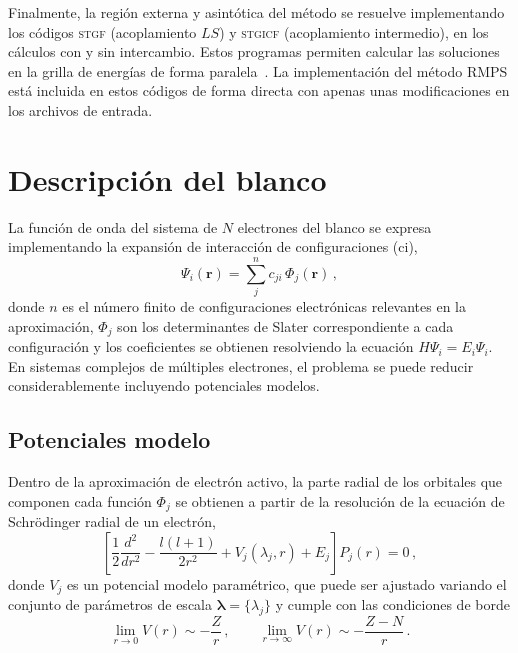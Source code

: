 Finalmente, la región externa y asintótica del método se resuelve 
implementando los códigos \textsc{stgf} (acoplamiento $LS$) y 
\textsc{stgicf} (acoplamiento intermedio), en los cálculos con y sin 
intercambio. Estos programas permiten calcular las soluciones en la 
grilla de energías de forma 
paralela~\cite{Mitnik:99,FernandezMenchero:20}. La implementación del 
método RMPS está incluida en estos códigos de forma directa con apenas 
unas modificaciones en los archivos de entrada.

\section{Descripción del blanco}
\label{sec:target-rmatrix}

La función de onda del sistema de $N$ electrones del blanco se expresa 
implementando la expansión de interacción de configuraciones (\acs{ci}),
\begin{equation*}
\Psi_i(\mathbf{r}) =
\sum_j^{n} c_{ji} \, \Phi_j(\mathbf{r})\,,
\end{equation*}
donde $n$ es el número finito de configuraciones electrónicas relevantes 
en la aproximación, $\Phi_j$ son los determinantes de Slater 
correspondiente a cada configuración y los coeficientes se obtienen 
resolviendo la ecuación $H\Psi_i=E_i\Psi_i$. En sistemas complejos de 
múltiples electrones, el problema se puede reducir considerablemente 
incluyendo potenciales modelos. 

\subsection{Potenciales modelo}
\label{subsec:potmod-rmatrix}

Dentro de la aproximación de electrón activo, la parte radial 
de los orbitales que componen cada función $\Phi_j$ se obtienen a partir 
de la resolución de la ecuación de Schr\"odinger radial de un electrón,
\begin{equation*}
\left[ \frac{1}{2} \frac{d^2}{dr^2} - \frac{l(l+1)}{2r^2} 
 + V_j(\lambda_j,r) + E_j \right] P_j(r)=0\,,
\label{eq:Schro-potmod}
\end{equation*}
donde $V_j$ es un potencial modelo paramétrico, que puede ser ajustado 
variando el conjunto de parámetros de escala 
$\boldsymbol\lambda=\{\lambda_j\}$ y cumple con las condiciones de borde
\begin{equation}
\lim_{r \rightarrow 0} V(r) \sim -\frac{Z}{r} \,,\qquad
\lim_{r \rightarrow \infty} V(r) \sim -\frac{Z-N}{r} \,.
\end{equation}


